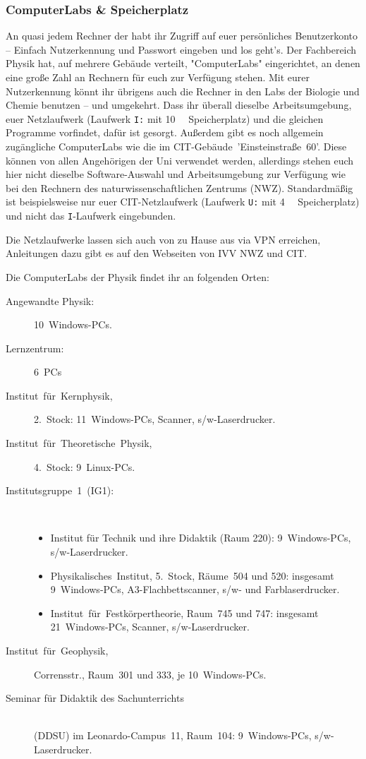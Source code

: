 \begin{multicols}{2}
\subsubsection{ComputerLabs \& Speicherplatz}
An quasi jedem Rechner der \UniMuenster{} habt ihr Zugriff auf euer persönliches Benutzerkonto -- Einfach Nutzerkennung und Passwort eingeben und los geht's.
Der Fachbereich Physik hat, auf mehrere Gebäude verteilt, "ComputerLabs" eingerichtet, an denen eine große Zahl an Rechnern für euch zur Verfügung stehen.
Mit eurer Nutzerkennung könnt ihr übrigens auch die Rechner in den Labs der Biologie und Chemie benutzen -- und umgekehrt.
Dass ihr überall dieselbe Arbeitsumgebung, euer Netzlaufwerk (Laufwerk \texttt{I:} mit \SI{10}{\giga\byte} Speicherplatz) und die gleichen Programme vorfindet, dafür ist gesorgt.
Außerdem gibt es noch allgemein zugängliche ComputerLabs wie die im CIT-Gebäude~'Einsteinstraße~60'.
Diese können von allen Angehörigen der Uni verwendet werden, allerdings stehen euch hier nicht dieselbe Software-Auswahl und Arbeitsumgebung zur Verfügung wie bei den Rechnern des naturwissenschaftlichen Zentrums (NWZ).
Standardmäßig ist beispielsweise nur euer CIT-Netzlaufwerk (Laufwerk \texttt{U:} mit \SI{4}{\giga\byte} Speicherplatz) und nicht das \texttt{I}-Laufwerk eingebunden.

Die Netzlaufwerke lassen sich auch von zu Hause aus via VPN erreichen, Anleitungen dazu gibt es auf den Webseiten von IVV NWZ und CIT.

Die ComputerLabs der Physik findet ihr an folgenden Orten:
\begin{description}
	\item[Angewandte Physik:] 10~Windows-PCs.
	\item[Lernzentrum:] 6~PCs
	\item[Institut~für~Kernphysik,] 2.~Stock: 11~Windows-PCs, Scanner, s/w-Laserdrucker.
	\item[Institut~für~Theoretische~Physik,] 4.~Stock: 9~Linux-PCs.
	\item[Institutsgruppe~1~(IG1):]~
		\begin{itemize}[leftmargin=1mm]
			\item Institut für Technik und ihre Didaktik (Raum 220): 9~Windows-PCs, s/w-Laserdrucker.
			\item Physikalisches~Institut, 5.~Stock, Räume~504 und 520: insgesamt 9~Windows-PCs, A3-Flachbettscanner, s/w- und Farblaserdrucker.
			\item Institut~für~Festkörpertheorie, Raum~745 und 747: insgesamt 21~Windows-PCs, Scanner, s/w-Laserdrucker.
		\end{itemize}
	\item[Institut~für~Geophysik,] Corrensstr., Raum~301 und 333, je 10~Windows-PCs.
	\item[Seminar für Didaktik des Sachunterrichts]~\\(DDSU) im Leonardo-Campus~11, Raum~104: 9~Windows-PCs, s/w-Laserdrucker.
\end{description}


\end{multicols}
